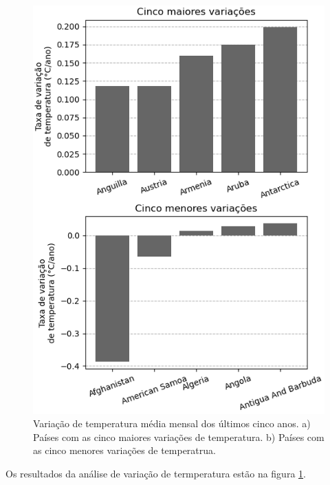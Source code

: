 \documentclass{article}
\begin{document}
\begin{figure}
	\includegraphics{../figuras/variacao_temperatura.png}
	\caption{
	Variação de temperatura média mensal dos últimos cinco anos.
	a) Países com as cinco maiores variações de temperatura.
	b) Países com as cinco menores variações de temperatrua.	
	}
	\label{fig:variacao}
\end{figure}

Os resultados da análise de variação de termperatura estão na figura \ref{fig:variacao}.



\end{document}
